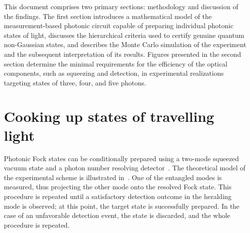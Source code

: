 \documentclass{article}
\begin{document}
This document comprises two primary sections:  methodology and discussion of the findings. The first section introduces a mathematical model of the measurement-based photonic circuit capable of preparing individual photonic states of light, discusses the hierarchical criteria used to certify genuine quantum non-Gaussian states, and describes the Monte Carlo simulation of the experiment and the subsequent interpretation of its results. Figures presented in the second section determine the minimal requirements for the efficiency of the optical components, such as squeezing and detection, in experimental realizations targeting states of three, four, and five photons.


%

\section{Cooking up states of travelling light}

Photonic Fock states can be conditionally prepared using a two-mode squeezed vacuum state and a photon number resolving detector~\cite{yukawa2013a,yoshikawa2018,tiedau2019,provaznik2020}. The theoretical model of the experimental scheme is illustrated in~. One of the entangled modes is measured, thus projecting the other mode onto the resolved Fock state. This procedure is repeated until a satisfactory detection outcome in the heralding mode is observed; at this point, the target state is successfully prepared. In the case of an unfavorable detection event, the state is discarded, and the whole procedure is repeated.
\end{document}

